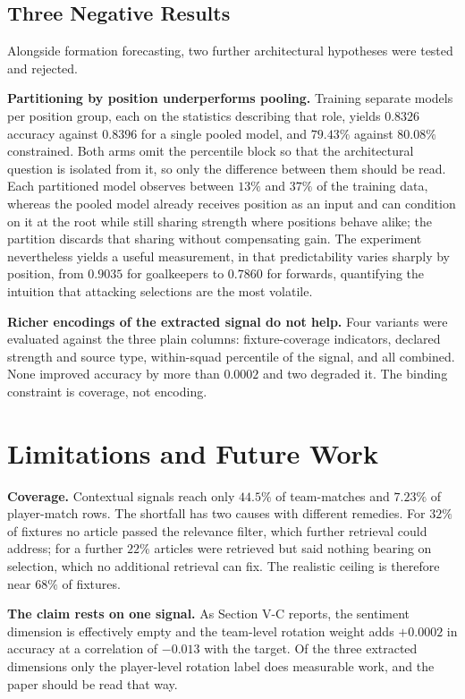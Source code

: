 \documentclass[conference]{IEEEtran}
\begin{document}
\subsection{Three Negative Results}

Alongside formation forecasting, two further architectural hypotheses were tested and rejected.

\textbf{Partitioning by position underperforms pooling.} Training separate models per position group, each on the statistics describing that role, yields $0.8326$ accuracy against $0.8396$ for a single pooled model, and $79.43\%$ against $80.08\%$ constrained. Both arms omit the percentile block so that the architectural question is isolated from it, so only the difference between them should be read. Each partitioned model observes between $13\%$ and $37\%$ of the training data, whereas the pooled model already receives position as an input and can condition on it at the root while still sharing strength where positions behave alike; the partition discards that sharing without compensating gain. The experiment nevertheless yields a useful measurement, in that predictability varies sharply by position, from $0.9035$ for goalkeepers to $0.7860$ for forwards, quantifying the intuition that attacking selections are the most volatile.

\textbf{Richer encodings of the extracted signal do not help.} Four variants were evaluated against the three plain columns: fixture-coverage indicators, declared strength and source type, within-squad percentile of the signal, and all combined. None improved accuracy by more than $0.0002$ and two degraded it. The binding constraint is coverage, not encoding.

\section{Limitations and Future Work}

\textbf{Coverage.} Contextual signals reach only $44.5\%$ of team-matches and $7.23\%$ of player-match rows. The shortfall has two causes with different remedies. For $32\%$ of fixtures no article passed the relevance filter, which further retrieval could address; for a further $22\%$ articles were retrieved but said nothing bearing on selection, which no additional retrieval can fix. The realistic ceiling is therefore near $68\%$ of fixtures.

\textbf{The claim rests on one signal.} As Section V-C reports, the sentiment dimension is effectively empty and the team-level rotation weight adds $+0.0002$ in accuracy at a correlation of $-0.013$ with the target. Of the three extracted dimensions only the player-level rotation label does measurable work, and the paper should be read that way.
\end{document}
